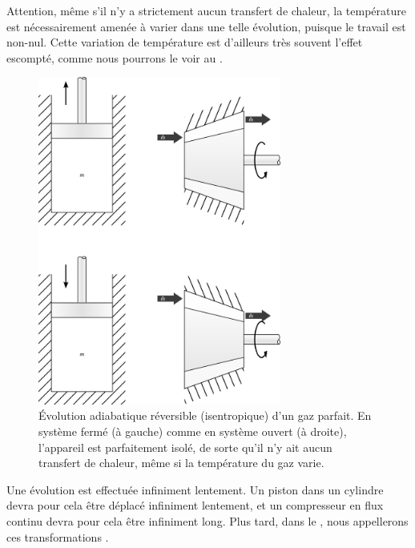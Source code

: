 		Attention, même s’il n’y a strictement aucun transfert de chaleur, la température est nécessairement amenée à varier dans une telle évolution, puisque le travail est non-nul. Cette variation de température est d’ailleurs très souvent l’effet escompté, comme nous pourrons le voir au \courssept.
		
		\begin{figure}
			\begin{center}
				\includegraphics[width=8cm]{images/isentropique.png}
			\end{center}
			\caption{Évolution adiabatique réversible (isentropique) d’un gaz parfait. En système fermé (à gauche) comme en système ouvert (à droite), l’appareil est parfaitement isolé, de sorte qu’il n’y ait aucun transfert de chaleur, même si la température du gaz varie.}
			\label{fig_gp_isentropique}
		\end{figure}
		
		Une évolution  est effectuée infiniment lentement. Un piston dans un cylindre devra pour cela être déplacé infiniment lentement, et un compresseur en flux continu devra pour cela être infiniment long. Plus tard, dans le \courshuit, nous appellerons ces transformations .

